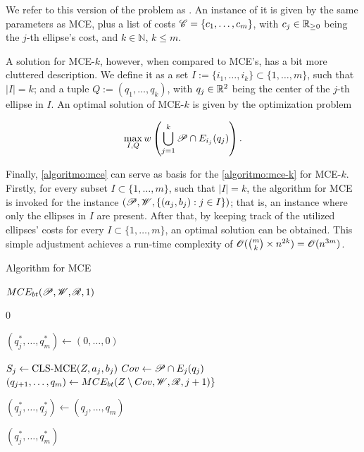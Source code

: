 We refer to this version of the problem as  . An instance of it is given by the same parameters as MCE, plus a list of costs $\mathscr{C}=\{c_1, \dots, c_m\}$, with $c_j\in\mathbb{R}_{\ge0}$ being the $j$-th ellipse's cost, and $k\in\mathbb{N}$, $k\le m$.

 A solution for MCE-$k$, however,  when compared to MCE's, has a bit more cluttered description. We define it as a set $I:=\{i_1, \dots, i_k\}\subset\{1, \dots, m\}$, such that $|I|=k$; and a tuple $Q:=(q_1, \dots, q_k)$, with $q_j\in\mathbb{R}^2$ being the center of the $j$-th ellipse in $I$. An optimal solution of MCE-$k$ is given by the optimization problem

\begin{equation*}
\max_{I, Q} w\left(\bigcup_{j=1}^k \mathscr{P} \cap E_{i_j}(q_j)\right).
\end{equation*}

Finally, \autoref{algoritmo:mce} can serve as basis for the \autoref{algoritmo:mce-k} for MCE-$k$. 
Firstly, for every subset $I \subset \{1, \dots, m\}$, such that $|I| = k$, the algorithm for MCE is invoked for the instance $(\mathscr{P}, \mathscr{W}, \{(a_j, b_j) : j \in I\})$; that is, an instance where only the ellipses in $I$ are present.
After that, by keeping track of the utilized ellipses' costs for every $I \subset \{1, \dots, m\}$, an optimal solution can be obtained.
This simple adjustment achieves a run-time complexity of $\mathscr{O}(\binom{m}{k} \times n^{2k}) = \mathscr{O}(n^{3m})$. 

\begin{algoritmo}
    \caption{Algorithm for MCE}\label{algoritmo:mce}
    
    \begin{algorithmic}[1]
        
        
        \item[]
	    \State \Return $MCE_{bt}(\mathscr{P}, \mathscr{W}, \mathscr{R}, 1)$
        \EndProcedure
        
        \State \Return $0$
        \EndIf
        
        \State $(q_j^*, \dots, q_m^*) \gets (0, \dots, 0)$

        \State $S_j \gets \textnormal{CLS-MCE}(Z, a_j, b_j)$
        \State $Cov \gets \mathscr{P} \cap E_j(q_j)$
        \State $(q_{j+1}, \dots, q_m) \gets MCE_{bt}(Z \setminus Cov, \mathscr{W}, \mathscr{R}, j+1)\}$
        
        \State $(q_j^*, \dots, q_j^*) \gets(q_j, \dots, q_m)$
        \EndIf
        \EndFor

        \State \Return $(q_j^*, \dots, q_m^*)$
        \EndProcedure
    \end{algorithmic}
\end{algoritmo}

